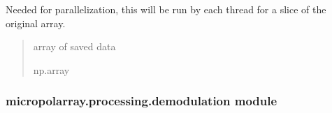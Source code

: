 \documentclass[letterpaper,10pt,english]{sphinxmanual}
\begin{document}
\begin{fulllineitems}
\label{\detokenize{micropolarray.processing:micropolarray.processing.convert.three_bytes_to_two_ints}}
\pysigstartsignatures
{}
\pysigstopsignatures
\sphinxAtStartPar
Needed for parallelization, this will be run by each thread for a slice of the original array.
\begin{quote}\begin{description}
\sphinxAtStartPar
array of saved data

\sphinxAtStartPar
np.array

\end{description}\end{quote}

\end{fulllineitems}



\subsubsection{micropolarray.processing.demodulation module}
\label{\detokenize{micropolarray.processing:module-micropolarray.processing.demodulation}}\label{\detokenize{micropolarray.processing:micropolarray-processing-demodulation-module}}
\end{document}
